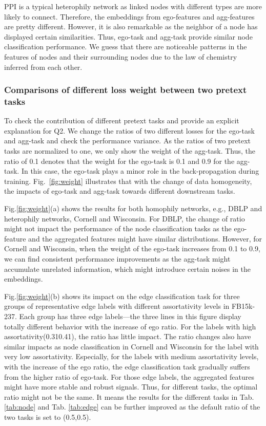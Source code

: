 \documentclass[10pt,journal,compsoc]{IEEEtran}
\begin{document}
PPI is a typical heterophily network as linked nodes with different types are more likely to connect. Therefore, the embeddings from ego-features and agg-features are pretty different. However, it is also remarkable as the neighbor of a node has displayed certain similarities. Thus, ego-task and agg-task provide similar node classification performance. We guess that there are noticeable patterns in the features of nodes and their surrounding nodes due to the law of chemistry inferred from each other.


\subsubsection {Comparisons of different loss weight between two pretext tasks}
To check the contribution of different pretext tasks and provide an explicit explanation for Q2. We change the ratios of two different losses for the ego-task and agg-task and check the performance variance. As the ratios of two pretext tasks are normalized to one, we only show the weight of the agg-task. Thus, the ratio of 0.1 denotes that the weight for the ego-task is 0.1 and 0.9 for the agg-task. In this case, the ego-task plays a minor role in the back-propagation during training.  Fig.~\ref{fig:weight} illustrates that with the change of data homogeneity, the impacts of ego-task and agg-task towards different downstream tasks. 


Fig.\ref{fig:weight}(a) shows the results for both homophily networks, e.g., DBLP and heterophily networks, Cornell and Wisconsin. For DBLP, the change of ratio might not impact the performance of the node classification tasks as the ego-feature and the aggregated features might have similar distributions. However, for Cornell and Wisconsin, when the weight of the ego-task increases from 0.1 to 0.9, we can find consistent performance improvements as the agg-task might accumulate unrelated information, which might introduce certain noises in the embeddings. 

Fig.\ref{fig:weight}(b) shows its impact on the edge classification task for three groups of representative edge labels with different assortativity levels in FB15k-237. Each group has three edge labels—the three lines in this figure display totally different behavior with the increase of ego ratio. For the labels with high assortativity(0.310.41), the ratio has little impact. The ratio changes also have similar impacts as node classification in Cornell and Wisconsin for the label with very low assortativity. Especially, for the labels with medium assortativity levels, with the increase of the ego ratio, the edge classification task gradually suffers from the higher ratio of ego-task. For those edge labels, the aggregated features might have more stable and robust signals. Thus, for different tasks, the optimal ratio might not be the same. It means the results for the different tasks in Tab. \ref{tab:node} and Tab. \ref{tab:edge} can be further improved as the default ratio of the two tasks is set to (0.5,0.5). 
\end{document}
